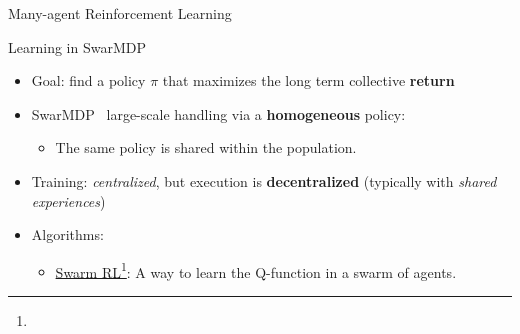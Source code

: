 \documentclass[presentation, 8pt,169]{beamer}\mode<presentation>{\usetheme{AMSBolognaFC}}
\begin{document}
\begin{frame}{Many-agent Reinforcement Learning}
\begin{block}{Learning in SwarMDP}
\begin{itemize}
    \item Goal: find a policy $\pi$ that maximizes the long term collective \textbf{return}
    \item SwarMDP \faArrowRight \, large-scale handling via a \textbf{homogeneous} policy:
      \begin{itemize}
        \item The same policy is shared within the population.
      \end{itemize}
    \item Training: \emph{centralized}, but execution is \textbf{decentralized} (typically with \emph{shared experiences})
    \item Algorithms:
      \begin{itemize}
        \item \underline{Swarm RL}\footnote[frame]{}: A way to learn the Q-function in a swarm of agents.
      \end{itemize}
  \end{itemize}
\end{block}

\end{frame}
\end{document}
